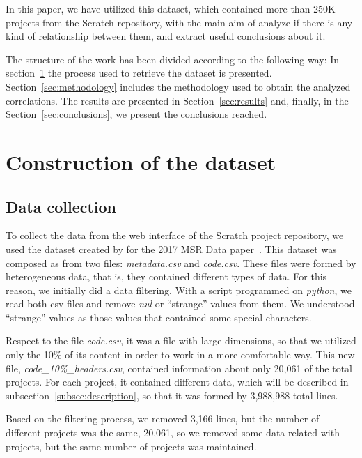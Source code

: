 \documentclass[a4paper,twocolumn,10pt]{article}
\begin{document}
In this paper, we have utilized this dataset, which contained more than 250K projects from the Scratch repository, with the
main aim of analyze if there is any kind of relationship between them, and extract useful conclusions about it. 

The structure of the work has been divided according to the following way: In section~\ref{sec:construction} the process used to retrieve the dataset is presented. Section~\ref{sec:methodology} includes the methodology used to obtain the analyzed correlations.
The results are presented in Section~\ref{sec:results} and, finally, in the Section~\ref{sec:conclusions}, we present the conclusions reached.



\section{Construction of the dataset}
\label{sec:construction}

\subsection{Data collection}

To collect the data from the web interface of the Scratch
project repository, we used the dataset created by for the 2017 MSR Data paper~\cite{aivaloglou2017dataset}.
This dataset was composed as from two files: \textit{metadata.csv} and
\textit{code.csv}. These files were formed by heterogeneous data, that is,
they contained different types of data. For this reason, we initially
did a data filtering. With a script programmed on \textit{python}, we read
both csv files and remove \textit{nul} or ``strange'' values from them.
We understood ``strange'' values as those values that contained some special
characters.

Respect to the file \textit{code.csv}, it was a file with large dimensions,
so that we utilized only the 10\% of its content in order to work in a more
comfortable way. This new file, \textit{code\_10\%\_headers.csv},
contained information about only 20,061 of the total projects. For each
project, it contained different data, which will be described in
subsection~\ref{subsec:description}, so that it was formed by 3,988,988 total lines.

Based on the filtering process, we removed 3,166 lines, but the number of
different projects was the same, 20,061, so we removed some data related with
projects, but the same number of projects was maintained.
\end{document}
